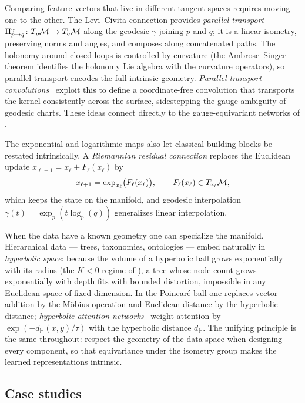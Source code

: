 Comparing feature vectors that live in different tangent spaces requires moving
one to the other. The Levi--Civita connection provides \emph{parallel transport}
$\Pi_{p \to q}^\gamma \colon T_p\mathcal{M} \to T_q\mathcal{M}$ along the geodesic $\gamma$ joining
$p$ and $q$; it is a linear isometry, preserving norms and angles, and composes
along concatenated paths. The holonomy around closed loops is controlled by
curvature (the Ambrose--Singer theorem identifies the holonomy Lie algebra with
the curvature operators), so parallel transport encodes the full intrinsic
geometry. \emph{Parallel transport convolutions}~\citep{schonsheck2018parallel}
exploit this to define a coordinate-free convolution that transports the kernel
consistently across the surface, sidestepping the gauge ambiguity of geodesic
charts. These ideas connect directly to the gauge-equivariant networks of
.

The exponential and logarithmic maps also let classical building blocks be
restated intrinsically. A \emph{Riemannian residual connection} replaces the
Euclidean update $x_{\ell+1} = x_\ell + F_\ell(x_\ell)$ by
\[
  x_{\ell+1} = \exp_{x_\ell}\!\big(F_\ell(x_\ell)\big),
    \qquad F_\ell(x_\ell) \in T_{x_\ell}\mathcal{M},
\]
which keeps the state on the manifold, and geodesic interpolation
$\gamma(t) = \exp_p(t \log_p(q))$ generalizes linear interpolation.

When the data have a known geometry one can specialize the manifold. Hierarchical
data --- trees, taxonomies, ontologies --- embed naturally in \emph{hyperbolic
space}: because the volume of a hyperbolic ball grows exponentially with its
radius (the $K < 0$ regime of ), a tree whose node count
grows exponentially with depth fits with bounded distortion, impossible in any
Euclidean space of fixed dimension. In the Poincar\'e ball one replaces vector
addition by the M\"obius operation and Euclidean distance by the hyperbolic
distance; \emph{hyperbolic attention
networks}~\citep{gulcehre2019hyperbolic} weight attention by
$\exp(-d_{\mathbb{H}}(x,y)/\tau)$ with the hyperbolic distance $d_{\mathbb{H}}$.
The unifying principle is the same throughout: respect the geometry of the data
space when designing every component, so that equivariance under the isometry
group makes the learned representations intrinsic.

\subsection{Case studies}
\label{subsec:geo:cases}

